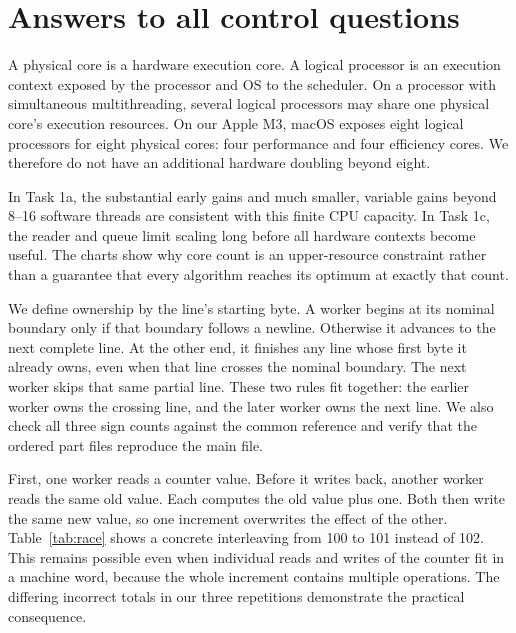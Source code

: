 \chapter{Answers to all control questions}
A physical core is a hardware execution core. A logical processor is an execution context exposed by the processor and OS to the scheduler. On a processor with simultaneous multithreading, several logical processors may share one physical core's execution resources. On our Apple M3, macOS exposes eight logical processors for eight physical cores: four performance and four efficiency cores. We therefore do not have an additional hardware doubling beyond eight.

In Task 1a, the substantial early gains and much smaller, variable gains beyond 8--16 software threads are consistent with this finite CPU capacity. In Task 1c, the reader and queue limit scaling long before all hardware contexts become useful. The charts show why core count is an upper-resource constraint rather than a guarantee that every algorithm reaches its optimum at exactly that count.

We define ownership by the line's starting byte. A worker begins at its nominal boundary only if that boundary follows a newline. Otherwise it advances to the next complete line. At the other end, it finishes any line whose first byte it already owns, even when that line crosses the nominal boundary. The next worker skips that same partial line. These two rules fit together: the earlier worker owns the crossing line, and the later worker owns the next line. We also check all three sign counts against the common reference and verify that the ordered part files reproduce the main file.

First, one worker reads a counter value. Before it writes back, another worker reads the same old value. Each computes the old value plus one. Both then write the same new value, so one increment overwrites the effect of the other. Table~\ref{tab:race} shows a concrete interleaving from 100 to 101 instead of 102. This remains possible even when individual reads and writes of the counter fit in a machine word, because the whole increment contains multiple operations. The differing incorrect totals in our three repetitions demonstrate the practical consequence.

